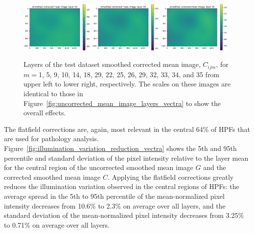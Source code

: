 \documentclass[letterpaper,11pt]{article}
\newcommand{\reffig}[1]{Figure~\ref{#1}}
\begin{document}
\begin{figure}[!ht]
\includegraphics[width=0.32\textwidth]{images/results/smoothed_corrected_mean_image_layers/smoothed_corrected_mean_image_layer_33_same_scale}
\includegraphics[width=0.32\textwidth]{images/results/smoothed_corrected_mean_image_layers/smoothed_corrected_mean_image_layer_34_same_scale}
\includegraphics[width=0.32\textwidth]{images/results/smoothed_corrected_mean_image_layers/smoothed_corrected_mean_image_layer_35_same_scale}
\caption{\footnotesize Layers of the test dataset smoothed corrected mean image, $C_{ijm}$, for $m=$1, 5, 9, 10, 14, 18, 29, 22, 25, 26, 29, 32, 33, 34, and 35 from upper left to lower right, respectively. The scales on these images are identical to those in \reffig{fig:uncorrected_mean_image_layers_vectra} to show the overall effects.}
\label{fig:corrected_smoothed_mean_image_layers_same_scale_vectra}
\end{figure}

The flatfield corrections are, again, most relevant in the central 64\% of HPFs that are used for pathology analysis. \reffig{fig:illumination_variation_reduction_vectra} shows the 5th and 95th percentile and standard deviation of the pixel intensity relative to the layer mean for the central region of the uncorrected smoothed mean image $G$ and the corrected smoothed mean image $C$. Applying the flatfield corrections greatly reduces the illumination variation observed in the central regions of HPFs: the average spread in the 5th to 95th percentile of the mean-normalized pixel intensity decreases from 10.6\% to 2.3\% on average over all layers, and the standard deviation of the mean-normalized pixel intensity decreases from 3.25\% to 0.71\% on average over all layers.
\end{document}
